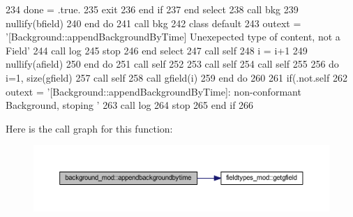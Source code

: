 \begin{DoxyCode}
234                         done = .true.
235                         \textcolor{keywordflow}{exit}
236 \textcolor{keywordflow}{                    end if}
237 \textcolor{keywordflow}{                end select}
238                 \textcolor{keyword}{call }bkg%
239                 \textcolor{keyword}{nullify}(bfield)
240 \textcolor{keywordflow}{            end do}
241             \textcolor{keyword}{call }bkg%
242 \textcolor{keywordflow}{            class default}
243             outext = \textcolor{stringliteral}{'[Background::appendBackgroundByTime] Unexepected type of content, not a Field'}
244             \textcolor{keyword}{call }log%
245             stop
246 \textcolor{keywordflow}{        end select}
247         \textcolor{keyword}{call }self%
248         i = i+1
249         \textcolor{keyword}{nullify}(afield)
250 \textcolor{keywordflow}{    end do}
251     \textcolor{keyword}{call }self%
252 
253     \textcolor{keyword}{call }self%
254     \textcolor{keyword}{call }self%
255 
256     \textcolor{keywordflow}{do} i=1, \textcolor{keyword}{size}(gfield)
257         \textcolor{keyword}{call }self%
258         \textcolor{keyword}{call }gfield(i)%
259 \textcolor{keywordflow}{    end do}
260 
261     \textcolor{keywordflow}{if}(.not.self%
262         outext = \textcolor{stringliteral}{'[Background::appendBackgroundByTime]: non-conformant Background, stoping '}
263         \textcolor{keyword}{call }log%
264         stop
265 \textcolor{keywordflow}{    end if}
266 
\end{DoxyCode}
Here is the call graph for this function\+:
\nopagebreak
\begin{figure}[H]
\begin{center}
\leavevmode
\includegraphics[width=350pt]{namespacebackground__mod_a02fa44cb4575159362bfa3b55520d387_cgraph}
\end{center}
\end{figure}
\mbox{\label{namespacebackground__mod_af2f517e4aa946491744e012153045bd4}} 
